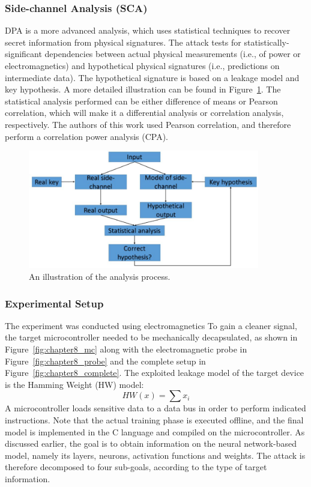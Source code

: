 \subsubsection{Side-channel Analysis (SCA)}
DPA is a more advanced analysis, which uses statistical techniques to recover secret information from physical signatures.
The attack tests for statistically-significant dependencies between actual physical measurements (i.e., of power or electromagnetics) and hypothetical physical signatures (i.e., predictions on intermediate data).
The hypothetical signature is based on a leakage model and key hypothesis. A more detailed illustration can be found in Figure~\ref{fig:chapter8_dpa}.
The statistical analysis performed can be either difference of means or Pearson correlation, which will make it a differential analysis or correlation analysis, respectively.
The authors of this work used Pearson correlation, and therefore perform a correlation power analysis (CPA).

\begin{figure}
    \centering
    \includegraphics[width=0.9\textwidth]{images/chapter8/dpa.JPG}
    \caption{An illustration of the analysis process.}
    \label{fig:chapter8_dpa}
\end{figure}

\subsubsection{Experimental Setup}
The experiment was conducted using electromagnetics 
To gain a cleaner signal, the target microcontroller needed to be mechanically decapsulated, as shown in Figure~\ref{fig:chapter8_mc} along with the electromagnetic probe in Figure~\ref{fig:chapter8_probe} and the complete setup in Figure~\ref{fig:chapter8_complete}.
The exploited leakage model of the target device is the Hamming Weight (HW) model:
$$HW(x) = \sum{x_i}$$
A microcontroller loads sensitive data to a data bus in order to perform indicated instructions.
Note that the actual training phase is executed offline, and the final model is implemented in the C language and compiled on the microcontroller.
As discussed earlier, the goal is to obtain information on the neural network-based model, namely its layers, neurons, activation functions and weights.
The attack is therefore decomposed to four sub-goals, according to the type of target information.


